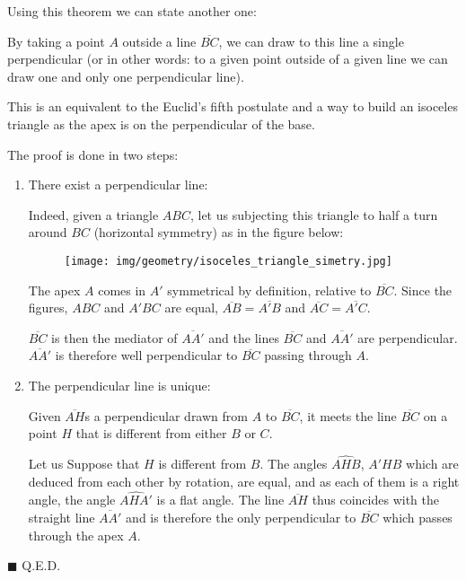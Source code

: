 	Using this theorem we can state another one:
	\begin{theorem}
	By taking a point $A$ outside a line $\overline{BC}$, we can draw to this line a single perpendicular (or in other words: to a given point outside of a given line we can draw one and only one perpendicular line).

	This is an equivalent to the Euclid's fifth postulate and a way to build an isoceles triangle as the apex is on the perpendicular of the base.
	\end{theorem}
	\begin{dem}
	The proof is done in two steps: 
	\begin{enumerate}
		\item There exist a perpendicular line:
		
		Indeed, given a triangle $ABC$, let us subjecting this triangle to half a turn around $BC$ (horizontal symmetry) as in the figure below:
		\begin{figure}[H]
			\centering
			\texttt{[image: img/geometry/isoceles\_triangle\_simetry.jpg]}
		\end{figure}
		The apex $A$ comes in $A'$ symmetrical by definition, relative to $\overline{BC}$. Since the figures, $ABC$ and $A'BC$ are equal, $\overline{AB}=\overline{A'B}$ and $\overline{AC} = \overline{A'C}$. 

		$\overline{BC}$ is then the mediator of $\overline{AA '}$ and the lines $\overline{BC}$ and $\overline{AA'}$ are perpendicular. $\overline{AA'}$ is therefore well perpendicular to $\overline{BC}$ passing through $A$.
		
		\item The perpendicular line is unique:
		
		Given $\overline{AH}$s a perpendicular drawn from $A$ to $\overline{BC}$, it meets the line $\overline{BC}$ on a point $H$ that is different from either $B$ or $C$.

		Let us Suppose that $H$ is different from $B$. The angles $\widehat{AHB}$, $A'HB$ which are deduced from each other by rotation, are equal, and as each of them is a right angle, the angle $\widehat{AHA'}$ is a flat angle. The line $\overline{AH}$ thus coincides with the straight line $\overline{AA'}$ and is therefore the only perpendicular to $\overline{BC}$ which passes through the apex $A$.

	\end{enumerate}
	\begin{flushright}
		$\blacksquare$  Q.E.D.
	\end{flushright}
	\end{dem}
